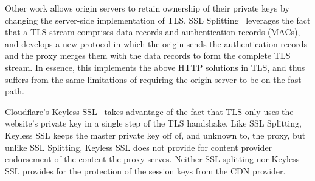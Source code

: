 %
Other work allows origin servers to retain ownership of their private keys by
changing the server-side implementation of TLS.
%
SSL Splitting~\cite{ssl-splitting} leverages the fact that a TLS stream
comprises data records and authentication records (MACs), and develops a new
protocol in which the origin sends the authentication records and the proxy
merges them with the data records to form the complete TLS stream.
%
In essence, this implements the above HTTP solutions in TLS, and thus suffers
from the same limitations of requiring the origin server to be on the fast
path.


%
%
%
%
%
%


Cloudflare's Keyless SSL~\cite{keyless-ssl} takes advantage of the fact that
TLS only uses the website's private key in a single step of the TLS handshake.
%
%
%
%
Like SSL Splitting, Keyless SSL keeps the master private key off of, and unknown
to, the proxy, but unlike SSL Splitting, Keyless SSL does not provide for
content provider endorsement of the content the proxy serves.  
%
Neither SSL splitting nor Keyless SSL provides for the protection of the
session keys from the CDN provider.


